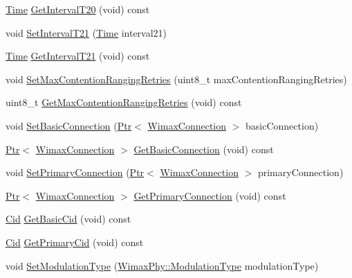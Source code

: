 \begin{DoxyCompactItemize}
\item 
\hyperlink{classns3_1_1Time}{Time} \hyperlink{classns3_1_1SubscriberStationNetDevice_a610c71850cdc6979a37516bff65b335b}{Get\+Interval\+T20} (void) const 
\item 
void \hyperlink{classns3_1_1SubscriberStationNetDevice_a3515531d206ef5a6f22e280e438ed323}{Set\+Interval\+T21} (\hyperlink{classns3_1_1Time}{Time} interval21)
\item 
\hyperlink{classns3_1_1Time}{Time} \hyperlink{classns3_1_1SubscriberStationNetDevice_a50ca17be4aafba3a5e4fe0b09377f63d}{Get\+Interval\+T21} (void) const 
\item 
void \hyperlink{classns3_1_1SubscriberStationNetDevice_a9773a4526d49df1e45a2ef73fef52d08}{Set\+Max\+Contention\+Ranging\+Retries} (uint8\+\_\+t max\+Contention\+Ranging\+Retries)
\item 
uint8\+\_\+t \hyperlink{classns3_1_1SubscriberStationNetDevice_a3aed1d6f40215ad2f993854d456e92a2}{Get\+Max\+Contention\+Ranging\+Retries} (void) const 
\item 
void \hyperlink{classns3_1_1SubscriberStationNetDevice_a5e6feaf1babe29ff2c74293ea507f4ec}{Set\+Basic\+Connection} (\hyperlink{classns3_1_1Ptr}{Ptr}$<$ \hyperlink{classns3_1_1WimaxConnection}{Wimax\+Connection} $>$ basic\+Connection)
\item 
\hyperlink{classns3_1_1Ptr}{Ptr}$<$ \hyperlink{classns3_1_1WimaxConnection}{Wimax\+Connection} $>$ \hyperlink{classns3_1_1SubscriberStationNetDevice_a9904faaaa9740432d8abc64b1464e032}{Get\+Basic\+Connection} (void) const 
\item 
void \hyperlink{classns3_1_1SubscriberStationNetDevice_a65babf4d4e460e77781661ccdc70e879}{Set\+Primary\+Connection} (\hyperlink{classns3_1_1Ptr}{Ptr}$<$ \hyperlink{classns3_1_1WimaxConnection}{Wimax\+Connection} $>$ primary\+Connection)
\item 
\hyperlink{classns3_1_1Ptr}{Ptr}$<$ \hyperlink{classns3_1_1WimaxConnection}{Wimax\+Connection} $>$ \hyperlink{classns3_1_1SubscriberStationNetDevice_a639f008c91cbf57411b58b3416b8cf23}{Get\+Primary\+Connection} (void) const 
\item 
\hyperlink{classns3_1_1Cid}{Cid} \hyperlink{classns3_1_1SubscriberStationNetDevice_a2f87aabdb63b51fb563d6d9fef04ddec}{Get\+Basic\+Cid} (void) const 
\item 
\hyperlink{classns3_1_1Cid}{Cid} \hyperlink{classns3_1_1SubscriberStationNetDevice_a0bd689906d989447d2da65be88513940}{Get\+Primary\+Cid} (void) const 
\item 
void \hyperlink{classns3_1_1SubscriberStationNetDevice_af6d2d096d7cac7ab7c9a08d0133c64e1}{Set\+Modulation\+Type} (\hyperlink{classns3_1_1WimaxPhy_a044c5d8a48ca992c39c2a946f6e755fa}{Wimax\+Phy\+::\+Modulation\+Type} modulation\+Type)

\end{DoxyCompactItemize}
